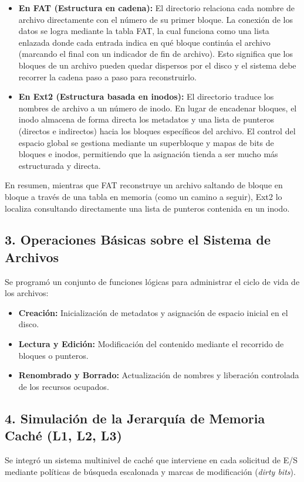 \documentclass[12pt,a4paper]{article}
\begin{document}
	\begin{itemize}
		\item \textbf{En FAT (Estructura en cadena):} El directorio relaciona cada nombre de archivo directamente con el número de su primer bloque. La conexión de los datos se logra mediante la tabla FAT, la cual funciona como una lista enlazada donde cada entrada indica en qué bloque continúa el archivo (marcando el final con un indicador de fin de archivo). Esto significa que los bloques de un archivo pueden quedar dispersos por el disco y el sistema debe recorrer la cadena paso a paso para reconstruirlo.
		\item \textbf{En Ext2 (Estructura basada en inodos):} El directorio traduce los nombres de archivo a un número de inodo. En lugar de encadenar bloques, el inodo almacena de forma directa los metadatos y una lista de punteros (directos e indirectos) hacia los bloques específicos del archivo. El control del espacio global se gestiona mediante un superbloque y mapas de bits de bloques e inodos, permitiendo que la asignación tienda a ser mucho más estructurada y directa.
	\end{itemize}
	
	En resumen, mientras que FAT reconstruye un archivo saltando de bloque en bloque a través de una tabla en memoria (como un camino a seguir), Ext2 lo localiza consultando directamente una lista de punteros contenida en un inodo.
	
	\subsection{3. Operaciones Básicas sobre el Sistema de Archivos}
	Se programó un conjunto de funciones lógicas para administrar el ciclo de vida de los archivos:
	\begin{itemize}
		\item \textbf{Creación:} Inicialización de metadatos y asignación de espacio inicial en el disco.
		\item \textbf{Lectura y Edición:} Modificación del contenido mediante el recorrido de bloques o punteros.
		\item \textbf{Renombrado y Borrado:} Actualización de nombres y liberación controlada de los recursos ocupados.
	\end{itemize}
	
	\subsection{4. Simulación de la Jerarquía de Memoria Caché (L1, L2, L3)}
	Se integró un sistema multinivel de caché que interviene en cada solicitud de E/S mediante políticas de búsqueda escalonada y marcas de modificación (\textit{dirty bits}).
	
\end{document}
